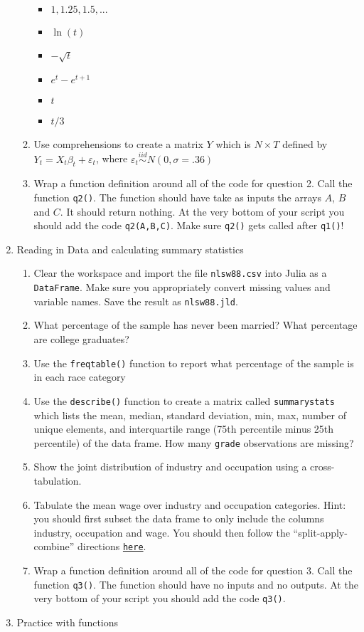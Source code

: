 \documentclass[12pt,english]{article}
\begin{document}
\begin{enumerate}
\begin{enumerate}
\begin{itemize}
\item $1,1.25,1.5,...$
\item $\ln\left(t\right)$
\item $-\sqrt{t}$
\item $e^{t}-e^{t+1}$
\item $t$
\item $t/3$
\end{itemize}
\item Use comprehensions to create a matrix $Y$ which is $N\times T$ defined by $Y_{t}=X_{t}\beta_{t}+\varepsilon_{t}$, where $\varepsilon_{t}\overset{iid}{\sim}N\left(0,\sigma=.36\right)$
\item Wrap a function definition around all of the code for question 2. Call the function \texttt{q2()}. The function should have take as inputs the arrays $A$, $B$ and $C$. It should return nothing. At the very bottom of your script you should add the code \texttt{q2(A,B,C)}. Make sure \texttt{q2()} gets called after \texttt{q1()}!
\end{enumerate}
\item Reading in Data and calculating summary statistics

\begin{enumerate}
\item Clear the workspace and import the file \texttt{nlsw88.csv} into Julia as a \texttt{DataFrame}. Make sure you appropriately convert missing values and variable names. Save the result as \texttt{nlsw88.jld}.
\item What percentage of the sample has never been married? What percentage are college graduates?
\item Use the \texttt{freqtable()} function to report what percentage of the sample is in each race category
\item Use the \texttt{describe()} function to create a matrix called \texttt{summarystats} which lists the mean, median, standard deviation, min, max, number of unique elements, and interquartile range (75th percentile minus 25th percentile) of the data frame. How many \texttt{grade} observations are missing?
\item Show the joint distribution of industry and occupation using a cross-tabulation.
\item Tabulate the mean wage over industry and occupation categories. Hint: you should first subset the data frame to only include the columns industry, occupation and wage. You should then follow the ``split-apply-combine'' directions \href{https://juliadata.github.io/DataFrames.jl/stable/man/split_apply_combine/}{\texttt{here}}.
\item Wrap a function definition around all of the code for question 3. Call the function \texttt{q3()}. The function should have no inputs and no outputs. At the very bottom of your script you should add the code \texttt{q3()}.
\end{enumerate}
\item Practice with functions


\end{enumerate}
\end{document}

